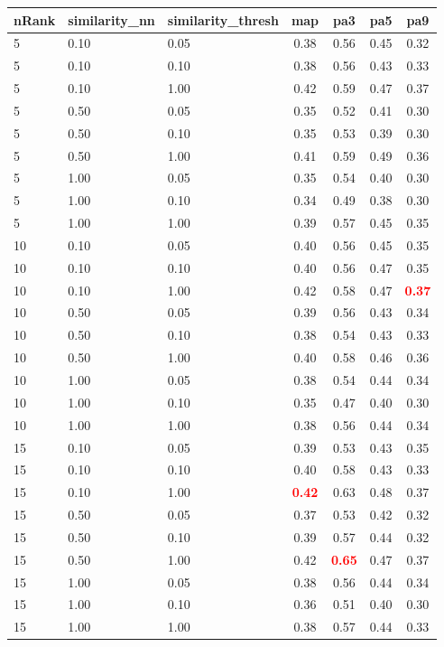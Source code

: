 \begin{tabular}{lllcccc} 
nRank & similarity\_nn & similarity\_thresh & map & pa3 & pa5 & pa9 \\ 
\hline 
 5 & 0.10 & 0.05 & 0.38 & 0.56 & 0.45 & 0.32 \\ 
 5 & 0.10 & 0.10 & 0.38 & 0.56 & 0.43 & 0.33 \\ 
 5 & 0.10 & 1.00 & 0.42 & 0.59 & 0.47 & 0.37 \\ 
 5 & 0.50 & 0.05 & 0.35 & 0.52 & 0.41 & 0.30 \\ 
 5 & 0.50 & 0.10 & 0.35 & 0.53 & 0.39 & 0.30 \\ 
 5 & 0.50 & 1.00 & 0.41 & 0.59 & 0.49 & 0.36 \\ 
 5 & 1.00 & 0.05 & 0.35 & 0.54 & 0.40 & 0.30 \\ 
 5 & 1.00 & 0.10 & 0.34 & 0.49 & 0.38 & 0.30 \\ 
 5 & 1.00 & 1.00 & 0.39 & 0.57 & 0.45 & 0.35 \\ 
10 & 0.10 & 0.05 & 0.40 & 0.56 & 0.45 & 0.35 \\ 
10 & 0.10 & 0.10 & 0.40 & 0.56 & 0.47 & 0.35 \\ 
10 & 0.10 & 1.00 & 0.42 & 0.58 & 0.47 & \textbf{\textcolor{red}{0.37}} \\ 
10 & 0.50 & 0.05 & 0.39 & 0.56 & 0.43 & 0.34 \\ 
10 & 0.50 & 0.10 & 0.38 & 0.54 & 0.43 & 0.33 \\ 
10 & 0.50 & 1.00 & 0.40 & 0.58 & 0.46 & 0.36 \\ 
10 & 1.00 & 0.05 & 0.38 & 0.54 & 0.44 & 0.34 \\ 
10 & 1.00 & 0.10 & 0.35 & 0.47 & 0.40 & 0.30 \\ 
10 & 1.00 & 1.00 & 0.38 & 0.56 & 0.44 & 0.34 \\ 
15 & 0.10 & 0.05 & 0.39 & 0.53 & 0.43 & 0.35 \\ 
15 & 0.10 & 0.10 & 0.40 & 0.58 & 0.43 & 0.33 \\ 
15 & 0.10 & 1.00 & \textbf{\textcolor{red}{0.42}} & 0.63 & 0.48 & 0.37 \\ 
15 & 0.50 & 0.05 & 0.37 & 0.53 & 0.42 & 0.32 \\ 
15 & 0.50 & 0.10 & 0.39 & 0.57 & 0.44 & 0.32 \\ 
15 & 0.50 & 1.00 & 0.42 & \textbf{\textcolor{red}{0.65}} & 0.47 & 0.37 \\ 
15 & 1.00 & 0.05 & 0.38 & 0.56 & 0.44 & 0.34 \\ 
15 & 1.00 & 0.10 & 0.36 & 0.51 & 0.40 & 0.30 \\ 
15 & 1.00 & 1.00 & 0.38 & 0.57 & 0.44 & 0.33 \\ 

\end{tabular}
